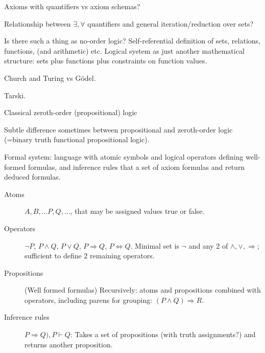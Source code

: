 \cite{wiki:Logic}

\cite{Ferreiros2001RoadModernLogic}

Axioms with quantifiers vs axiom schemas?

Relationship between $\exists, \forall$ quantifiers
and general iteration/reduction over sets?

Is there such a thing as no-order logic?
Self-referential definition of sets, relations, functions,
(and arithmetic) etc. 
Logical system  as just another mathematical structure:
sets plus functions plus constraints on function values.

Church and Turing vs G\"{o}del.

Tarski.

\label{sec:Classical Logic}

\cite{sep-logic-classical}

\label{sec:Formal_languages}

\cite{dutilh_novaes_2012}

\label{sec:Proof_theory}

\label{sec:Model_theory}

\label{sec:Zeroth_order_logic}

Classical zeroth-order (propositional) 
logic~\cite{iep:Propositional_logic,
wiki:Propositional_calculus,
wiki:Zeroth_order_logic}

Subtle difference sometimes between propositional
and zeroth-order logic 
(=binary truth functional propositional logic).

Formal system:
language with atomic symbols
and logical operators defining well-formed formulas,
and inference rules that a set of axiom formulas 
and return deduced formulas.
\begin{description}
\item[Atoms]  $A, B, \ldots P, Q, \ldots$, 
that may be assigned values \textsf{true} or \textsf{false}.

\item[Operators] $\lnot P$, $P \wedge Q$, $P \vee Q$, 
$P \Rightarrow Q$, $P \Leftrightarrow Q$. 
Minimal set is $\lnot$ and 
any $2$ of  $\wedge, \vee, \Rightarrow$;
sufficient to define $2$ remaining operators.

\item[Propositions] (Well formed formulas)
Recursively: atoms and propositions combined with operators,
including parens for grouping: $(P \wedge Q) \Rightarrow R$.

\item[Inference rules] ${P \Rightarrow Q), P} \vdash Q$:
Takes a set of propositions (with truth assignments?)
and returns another proposition.
\end{description}

